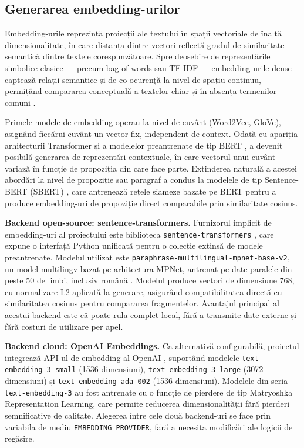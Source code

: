 \documentclass[12pt, a4paper, oneside, romanian]{teza-upb}
\begin{document}
\subsection{Generarea embedding-urilor}

Embedding-urile reprezintă proiecții ale textului în spații vectoriale de înaltă dimensionalitate, în care distanța dintre vectori reflectă gradul de similaritate semantică dintre textele corespunzătoare. Spre deosebire de reprezentările simbolice clasice — precum bag-of-words sau TF-IDF — embedding-urile dense captează relații semantice și de co-ocurență la nivel de spațiu continuu, permițând compararea conceptuală a textelor chiar și în absența termenilor comuni \cite{mikolov2013word2vec}.

Primele modele de embedding operau la nivel de cuvânt (Word2Vec, GloVe), asignând fiecărui cuvânt un vector fix, independent de context. Odată cu apariția arhitecturii Transformer și a modelelor preantrenate de tip BERT \cite{devlin2018bert}, a devenit posibilă generarea de reprezentări contextuale, în care vectorul unui cuvânt variază în funcție de propoziția din care face parte. Extinderea naturală a acestei abordări la nivel de propoziție sau paragraf a condus la modelele de tip Sentence-BERT (SBERT) \cite{reimers2019sbert}, care antrenează rețele siameze bazate pe BERT pentru a produce embedding-uri de propoziție direct comparabile prin similaritate cosinus.

\textbf{Backend open-source: sentence-transformers.} Furnizorul implicit de embedding-uri al proiectului este biblioteca \texttt{sentence-transformers} \cite{sentence_transformers_doc}, care expune o interfață Python unificată pentru o colecție extinsă de modele preantrenate. Modelul utilizat este \texttt{paraphrase-multilingual-mpnet-base-v2}, un model multilingv bazat pe arhitectura MPNet, antrenat pe date paralele din peste 50 de limbi, inclusiv română \cite{reimers2019sbert}. Modelul produce vectori de dimensiune 768, cu normalizare L2 aplicată la generare, asigurând compatibilitatea directă cu similaritatea cosinus pentru compararea fragmentelor. Avantajul principal al acestui backend este că poate rula complet local, fără a transmite date externe și fără costuri de utilizare per apel.

\textbf{Backend cloud: OpenAI Embeddings.} Ca alternativă configurabilă, proiectul integrează API-ul de embedding al OpenAI \cite{openai_embeddings}, suportând modelele \texttt{text-embedding-3-small} (1536 dimensiuni), \texttt{text-embedding-3-large} (3072 dimensiuni) și \texttt{text-embedding-ada-002} (1536 dimensiuni). Modelele din seria \texttt{text-embedding-3} au fost antrenate cu o funcție de pierdere de tip Matryoshka Representation Learning, care permite reducerea dimensionalității fără pierderi semnificative de calitate. Alegerea între cele două backend-uri se face prin variabila de mediu \texttt{EMBEDDING\_PROVIDER}, fără a necesita modificări ale logicii de regăsire.
\end{document}
